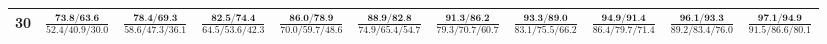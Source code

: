 \documentclass{slides}
\begin{document}
{{{\begin{tabular}{|c|c|c|c|c|c|c|c|c|c|c|}
\hline
30 & $\frac{\textbf{73.8/63.6}}{52.4/40.9/30.0}$ & $\frac{\textbf{78.4/69.3}}{58.6/47.3/36.1}$ & $\frac{\textbf{82.5/74.4}}{64.5/53.6/42.3}$ & $\frac{\textbf{86.0/78.9}}{70.0/59.7/48.6}$ & $\frac{\textbf{88.9/82.8}}{74.9/65.4/54.7}$ & $\frac{\textbf{91.3/86.2}}{79.3/70.7/60.7}$ & $\frac{\textbf{93.3/89.0}}{83.1/75.5/66.2}$ & $\frac{\textbf{94.9/91.4}}{86.4/79.7/71.4}$ & $\frac{\textbf{96.1/93.3}}{89.2/83.4/76.0}$ & $\frac{\textbf{97.1/94.9}}{91.5/86.6/80.1}$ \\
\hline
\end{tabular}}}}
\end{document}
